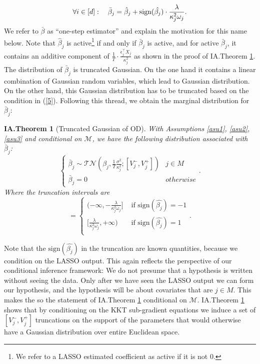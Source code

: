 \documentclass[11pt]{article}
\newcommand{\q}{\text{\quad}}
\newcommand{\sgn}{\textrm{sign}}
\newcommand{\NL}{\\[.4cm]}
\newtheorem{theorem}{IA.Theorem}
\begin{document}
	\begin{equation}\label{14}
		\forall i\in[d]:\q\bar{\beta}_j=\hat{\beta}_j+\sgn(\hat{\beta_j})\cdot \frac{\lambda}{\kappa_j^2\omega_j}.
	\end{equation}
	We refer to $\bar{\beta}$ as ``one-step estimator'' and explain the motivation for this name below. Note that $\hat{\beta}_j$ is active\footnote{We refer to a LASSO estimated coefficient as active if it is not 0.} if and only if $\bar{\beta}_j$ is active, and for active $\bar{\beta}_j$, it contains an additive component of $\frac{1}{T}\cdot\frac{\epsilon_j^\top X_j}{\kappa_j^2}$ as shown in the proof of IA.Theorem \ref{thm0}. The distribution of $\bar{\beta}_j$ is truncated Gaussian. On the one hand it contains a linear combination of Gaussian random variables, which lead to Gaussian distribution. On the other hand, this Gaussian distribution has to be truncated based on the condition in (\ref{5}). Following this thread, we obtain the marginal distribution for $\bar{\beta}_j$:
	\begin{theorem}[Truncated Gaussian of OD]\label{thm0}
		With Assumptions  \ref{asu1}, \ref{asu2}, \ref{asu3} and conditional on $\mathcal{M}$, we have the following distribution associated with $\bar{\beta}_j$:
		\begin{equation}
			\begin{cases}
				\bar{\beta}_j\sim\mathcal{TN}(\beta_j,\frac{1}{T}\frac{\sigma^2}{\kappa_j^2};[V^-_j,V^+_j]) & j\in M\\
				\bar{\beta}_j=0 & otherwise
			\end{cases}.
		\end{equation}	
		Where the truncation intervals are 
		\begin{equation}
			[V^-_j,V^+_j]=\begin{cases}
				(-\infty,-\frac{\lambda}{\kappa_j^2\omega_j}]& \text{ if }\sgn(\hat{\beta_j})=-1\\
				[\frac{\lambda}{\kappa_j^2\omega_j},+\infty)& \text{ if }\sgn(\hat{\beta_j})=1\\
			\end{cases}.
		\end{equation}	
	\end{theorem}
	Note that the $\sgn(\hat{\beta_j})$ in the truncation are known quantities, because we condition on the LASSO output. This again reflects the perspective of our conditional inference framework: We do not presume that a hypothesis is written without seeing the data. Only after we have seen the LASSO output we can form our hypothesis, and the hypothesis will be about covariates that are $j\in M$. This makes the so the statement of IA.Theorem \ref{thm0} conditional on $\mathcal{M}$. IA.Theorem \ref{thm0} shows that by conditioning on the KKT sub-gradient equations we induce a set of $[V_j^-,V_j^+]$ truncations on the support of the parameters that would otherwise have a Gaussian distribution over entire Euclidean space.\NL
	
\end{document}
